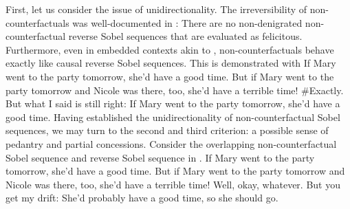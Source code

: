First, let us consider the issue of unidirectionality. The irreversibility of non-counterfactuals was well-documented in : There are no non-denigrated non-counterfactual reverse Sobel sequences that are evaluated as felicitous. Furthermore, even in embedded contexts akin to , non-counterfactuals behave exactly like causal reverse Sobel sequences. This is demonstrated with 
\pex{}
			\a	{}If Mary went to the party tomorrow, she'd have a good time.
			\a	{}But if Mary went to the party tomorrow and Nicole was there, too, she'd have a terrible time!
			\a	{}\#Exactly. But what I said is still right: If Mary went to the party tomorrow, she'd have a good time.
\xe
Having established the unidirectionality of non-counterfactual Sobel sequences, we may turn to the second and third criterion: a possible sense of pedantry and partial concessions. Consider the overlapping non-counterfactual Sobel sequence and reverse Sobel sequence in .
\pex{}
			\a	{}If Mary went to the party tomorrow, she'd have a good time.
			\a	{}But if Mary went to the party tomorrow and Nicole was there, too, she'd have a terrible time!
			\a	{}Well, okay, whatever. But you get my drift: She'd probably have a good time, so she should go.
\xe

